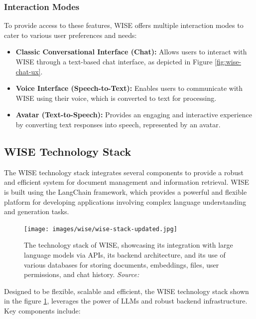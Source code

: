 \subsubsection{Interaction Modes}
To provide access to these features, WISE offers multiple interaction modes to cater to various user preferences and needs:

\begin{itemize}
    \item \textbf{Classic Conversational Interface (Chat):} Allows users to interact with WISE through a text-based chat interface, as depicted in Figure \ref{fig:wise-chat-ux}.
    \item \textbf{Voice Interface (Speech-to-Text):} Enables users to communicate with WISE using their voice, which is converted to text for processing.
    \item \textbf{Avatar (Text-to-Speech):} Provides an engaging and interactive experience by converting text responses into speech, represented by an avatar.
\end{itemize}

\subsection{WISE Technology Stack}

The WISE technology stack integrates several components to provide a robust and efficient system for document management and information retrieval. WISE is built using the LangChain \cite{langchain2024} framework, which provides a powerful and flexible platform for developing applications involving complex language understanding and generation tasks.

\begin{figure}[h!]
    \centering
    \texttt{[image: images/wise/wise-stack-updated.jpg]}
    \caption{The technology stack of WISE, showcasing its integration with large language models via APIs, its backend architecture, and its use of various databases for storing documents, embeddings, files, user permissions, and chat history. \textit{Source:} \cite{hpa2024}}
    \label{fig:wise-stack}
\end{figure}

Designed to be flexible, scalable and efficient, the WISE technology stack shown in the figure \ref{fig:wise-stack}, leverages the power of LLMs and robust backend infrastructure. Key components include:

